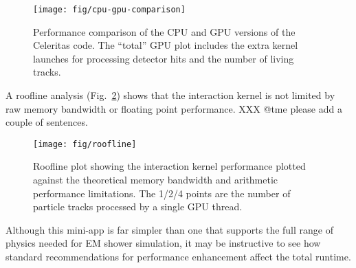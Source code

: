 \documentclass{webofc}
\begin{document}
\begin{figure}[htb]
  \centering
  \texttt{[image: fig/cpu-gpu-comparison]}
  \caption{Performance comparison of the CPU and GPU versions of the Celeritas
  code. The ``total'' GPU plot includes the extra kernel launches for processing
  detector hits and the number of living tracks.}
  \label{fig:baseline}
\end{figure}

A roofline analysis (Fig.~\ref{fig:roofline}) shows that the interaction kernel
is not limited by raw memory bandwidth or floating point performance. XXX @tme
please add a couple of sentences.

\begin{figure}[htb]
  \centering
  \texttt{[image: fig/roofline]}
  \caption{Roofline plot showing the interaction kernel performance
    plotted against the theoretical memory bandwidth and arithmetic performance
    limitations. The 1/2/4 points are the number of particle tracks processed by
    a single GPU thread.}
  \label{fig:roofline}
\end{figure}

\clearpage

Although this mini-app is far simpler than one that supports the full range of
physics needed for EM shower simulation, it may be instructive to see how
standard recommendations for performance enhancement affect the total runtime.
\end{document}
